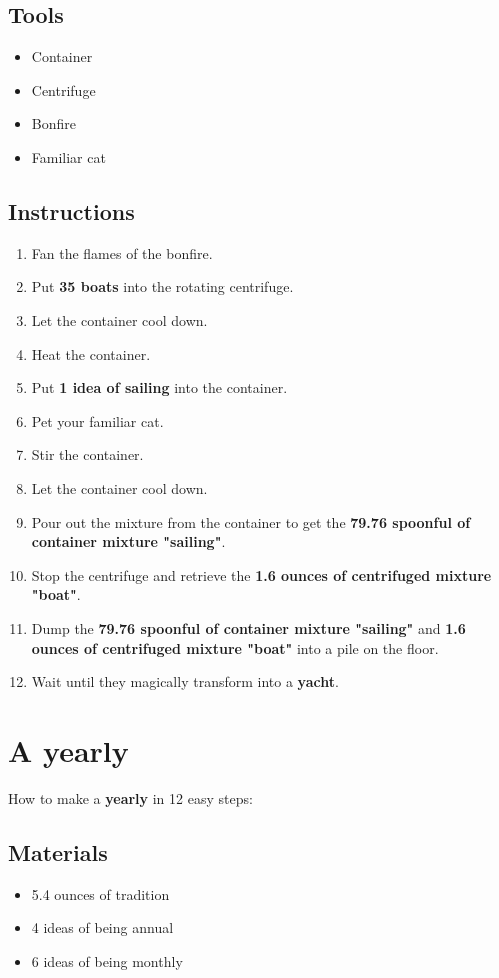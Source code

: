 \documentclass{article}
\begin{document}
\subsection{Tools}\begin{itemize}
\item 
Container
\item 
Centrifuge
\item 
Bonfire
\item 
Familiar cat
\end{itemize}
\subsection{Instructions}\begin{enumerate}
\item 
Fan the flames of the bonfire.
\item 
Put \textbf{35 boats} into the rotating centrifuge.
\item 
Let the container cool down.
\item 
Heat the container.
\item 
Put \textbf{1 idea of sailing} into the container.
\item 
Pet your familiar cat.
\item 
Stir the container.
\item 
Let the container cool down.
\item 
Pour out the mixture from the container to get the \textbf{79.76 spoonful of container mixture "sailing"}.
\item 
Stop the centrifuge and retrieve the \textbf{1.6 ounces of centrifuged mixture "boat"}.
\item 
Dump the \textbf{79.76 spoonful of container mixture "sailing"} and \textbf{1.6 ounces of centrifuged mixture "boat"} into a pile on the floor.
\item 
Wait until they magically transform into a \textbf{yacht}.
\end{enumerate}
\newpage
\section{A yearly}How to make a \textbf{yearly} in 12 easy steps:

\subsection{Materials}\begin{itemize}
\item 
5.4 ounces of tradition
\item 
4 ideas of being annual
\item 
6 ideas of being monthly
\end{itemize}
\end{document}

